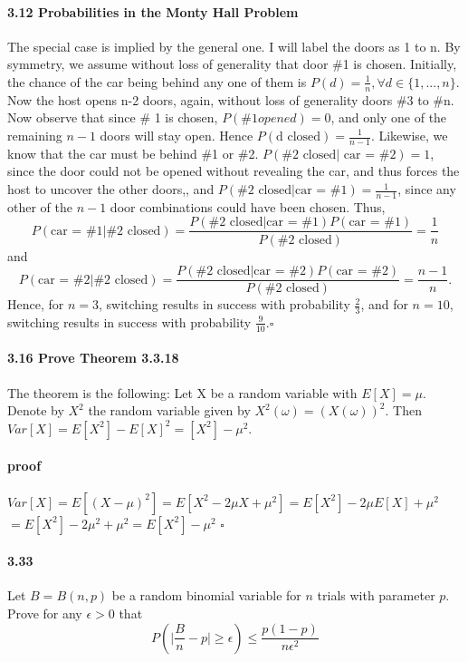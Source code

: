 \documentclass[letterpaper,12pt]{article}
\theoremstyle{definition}
\begin{document}
\begin{enumerate}
    \paragraph{3.12 Probabilities in the Monty Hall Problem} 
    The special case is implied by the general one. I will label the doors as 1 to n. By symmetry, we assume without loss of generality that door \#1 is chosen. Initially,  the chance of  the car being behind any one of them is $P(d) = \frac{1}{n}, \forall d\in\{1,...,n\}$. Now the host opens n-2 doors, again, without loss of generality doors \#3 to \#n. Now observe that since \# 1 is chosen, $P(\# 1 opened) = 0 $, and only one of the remaining $n-1$ doors will stay open. Hence $P(\text{d closed}) = \frac{1}{n-1}$. Likewise, we know that the car must be behind \#1 or \#2. $P(\text{\#2 closed} \vert \text{ car = \#2}) = 1$, since the door could not be opened without revealing the car, and thus forces the host to uncover the other doors,, and $P(\text{\#2 closed} \vert \text{car = \#1}) = \frac{1}{n-1}$, since any other of the $n - 1$ door combinations could have been chosen.
    Thus, $$ P(\text{car = \#1} | \text{\#2 closed}) = \frac{P(\text{\#2 closed} |\text{car = \#1} )P(\text{car = \#1} )}{P(\text{\#2 closed})} = \frac{1}{n} $$
    and 
    $$ P(\text{car = \#2} | \text{\#2 closed}) = \frac{P(\text{\#2 closed} |\text{car = \#2} )P(\text{car = \#2} )}{P(\text{\#2 closed})} = \frac{n - 1}{n}.$$
    Hence, for $n = 3$, switching results in success with probability $\frac{2}{3}$, and for $n = 10$, switching results in success with probability $\frac{9}{10}. \square$
    
    \paragraph{3.16 Prove Theorem 3.3.18} The theorem is the following: Let X be a random variable with  $E[X] = \mu$. Denote by $X^2$ the random variable given by $X^2(\omega) = (X(\omega))^2$. Then $Var[X] = E[X^2] - E[X]^2 = [X^2] - \mu^2$.
    \paragraph{proof} $ Var[X] = E[(X - \mu)^2]  = E[X^2 - 2 \mu X  + \mu^2] = E[X^2] - 2 \mu E[X]  + \mu^2 $ $= E[X^2] - 2 \mu^2  + \mu^2 = E[X^2] - \mu^2 $  $\square$
    
    \paragraph{3.33} Let $B = B(n,p)$ be a random binomial variable for $n$ trials with parameter $p$. Prove for any $\epsilon > 0$ that  $$ P(\vert \frac{B}{n} - p \vert \ge \epsilon)  \le \frac{p(1-p)}{n\epsilon^2}$$
    

\end{enumerate}
\end{document}
